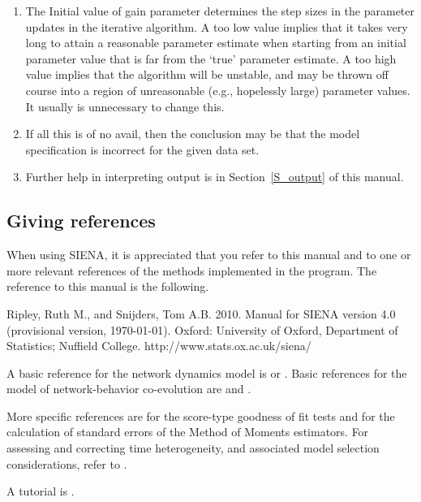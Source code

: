 \documentclass[a4paper,fleqn]{article}
\newcommand{\+}{\, + \,}
\newcommand{\si}{{\sf SIENA}}
\begin{document}
{\begin{enumerate}
      \smallskip

\item The \textsf{Initial value of gain parameter} determines the
      step sizes in the parameter updates in the iterative
      algorithm.
      A too low value implies that it takes very long to attain a
      reasonable parameter estimate when starting from an initial
      parameter value that is far from the `true' parameter estimate.
      A too high value implies that the algorithm will be unstable,
      and may be thrown off course into a region of unreasonable
      (e.g., hopelessly large) parameter values.\\
      It usually is unnecessary to change
      this.
    \item If all this is of no avail, then the conclusion may be that the model
      specification is incorrect for the given data set.
    \item Further help in interpreting output is in Section~\ref{S_output} of
      this manual.
\end{enumerate}

\newpage
\subsection{Giving references}

When using \si, it is appreciated that you refer to this manual and to one or
more relevant references of the methods implemented in the program.  The
reference to this manual is the following.  \smallskip

\noindent
Ripley, Ruth M., and Snijders, Tom A.B.
2010.
Manual for SIENA version 4.0 (provisional version, \today).
Oxford: University of Oxford, Department of Statistics; Nuffield College.
\textsf{http://www.stats.ox.ac.uk/siena/}

\smallskip

A basic reference for the network dynamics model is \citet{Snijders01}
or \citet{Snijders05}.
Basic references for the model of network-behavior co-evolution
are \citet*{SnijdersEA07} and \citet*{SteglichEA10}.

More specific references are \citet{Schweinberger10} for the score-type goodness
of fit tests and \citet{SchweinbergerSnijders07a} for the calculation of
standard errors of the Method of Moments estimators. For assessing and
correcting time heterogeneity, and associated model selection considerations,
refer to \citet*{Lospinoso2010a, Lospinoso2010b}.

A tutorial is \citet*{SnijdersEA10b}.


}
\end{document}
